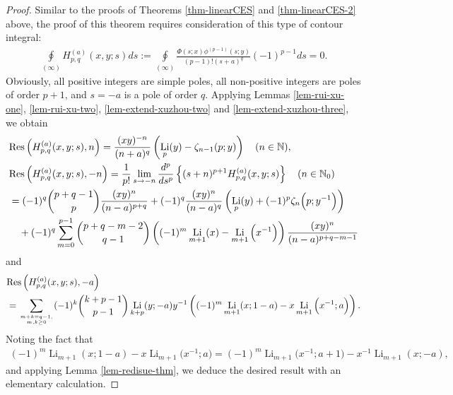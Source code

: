 \documentclass[11pt]{article}
\newcommand\Res{{\rm Res}}
\DeclareMathOperator{\Li}{Li}
\def\N{\mathbb{N}}
\theoremstyle{plain}
\theoremstyle{definition}
\begin{document}
\begin{proof}
Similar to the proofs of Theorems \ref{thm-linearCES} and \ref{thm-linearCES-2} above, the proof of this theorem requires consideration of this type of contour integral:
\begin{align*}
\oint\limits_{\left( \infty  \right)} H^{(a)}_{p,q}(x,y;s)ds:= \oint\limits_{\left( \infty  \right)} \frac{\Phi(s;x)\phi^{(p-1)}(s;y)}{(p-1)!(s+a)^q} (-1)^{p-1}ds=0.
\end{align*}
Obviously, all positive integers are simple poles, all non-positive integers are poles of order $p+1$, and $s=-a$ is a pole of order $q$. Applying Lemmas \ref{lem-rui-xu-one}, \ref{lem-rui-xu-two}, \ref{lem-extend-xuzhou-two} and \ref{lem-extend-xuzhou-three}, we obtain
\begin{align*}
&\Res\left(H^{(a)}_{p,q}(x,y;s),n\right)=\frac{(xy)^{-n}}{(n+a)^q}\left(\Li_p(y)-\zeta_{n-1}(p;y)\right)\quad (n\in \N),\\
&\Res\left(H^{(a)}_{p,q}(x,y;s),-n\right)=\frac1{p!}\lim_{s\rightarrow -n} \frac{d^p}{ds^p}\left\{(s+n)^{p+1}H^{(a)}_{p,q}(x,y;s)\right\}\quad (n\in\N_0)\\
&=(-1)^q\binom{p+q-1}{p}\frac{(xy)^n}{(n-a)^{p+q}}+(-1)^q\frac{(xy)^n}{(n-a)^q}\left(\Li_p(y)+(-1)^p\zeta_n\Big(p;y^{-1}\Big)\right)\\
&\quad+(-1)^q\sum_{m=0}^{p-1} \binom{p+q-m-2}{q-1}\left((-1)^m\Li_{m+1}(x)-\Li_{m+1}\Big(x^{-1}\Big)\right)\frac{(xy)^n}{(n-a)^{p+q-m-1}}
\end{align*}
and
\begin{align*}
&\Res\left(H^{(a)}_{p,q}(x,y;s),-a\right)\\
&=\sum_{m+k=q-1,\atop m,k\geq 0} (-1)^k\binom{k+p-1}{p-1}\Li_{k+p}(y;-a)y^{-1}\left((-1)^m\Li_{m+1}(x;1-a)-x \Li_{m+1}\Big(x^{-1};a\Big)\right).
\end{align*}
Noting the fact that
\begin{align*}
(-1)^m\Li_{m+1}(x;1-a)-x \Li_{m+1}\Big(x^{-1};a\Big)=(-1)^m\Li_{m+1}\Big(x^{-1};a+1\Big)-x^{-1}\Li_{m+1}(x;-a),
\end{align*}
and applying Lemma \ref{lem-redisue-thm}, we deduce the desired result with an elementary calculation.
\end{proof}
\end{document}
